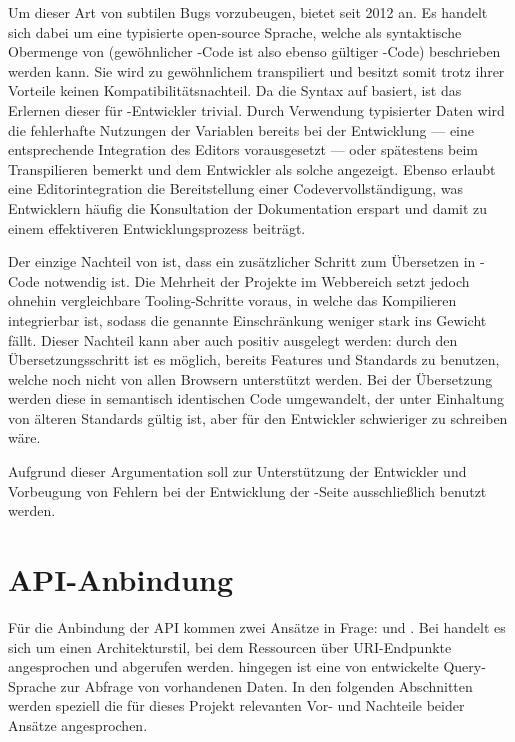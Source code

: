 Um dieser Art von subtilen Bugs vorzubeugen, bietet  seit 2012  an. Es handelt sich dabei um eine typisierte open-source Sprache, welche als syntaktische Obermenge von  (gewöhnlicher -Code ist also ebenso gültiger -Code) beschrieben werden kann. Sie wird zu gewöhnlichem  transpiliert und besitzt somit trotz ihrer Vorteile keinen Kompatibilitätsnachteil. Da die Syntax auf  basiert, ist das Erlernen dieser für -Entwickler trivial. Durch Verwendung typisierter Daten wird die fehlerhafte Nutzungen der Variablen bereits bei der Entwicklung --- eine entsprechende Integration des Editors vorausgesetzt --- oder spätestens beim Transpilieren bemerkt und dem Entwickler als solche angezeigt. Ebenso erlaubt eine Editorintegration die Bereitstellung einer Codevervollständigung, was Entwicklern häufig die Konsultation der Dokumentation erspart und damit zu einem effektiveren Entwicklungsprozess beiträgt.

Der einzige Nachteil von  ist, dass ein zusätzlicher Schritt zum Übersetzen in -Code notwendig ist. 
Die Mehrheit der Projekte im Webbereich setzt jedoch ohnehin vergleichbare Tooling-Schritte voraus, in welche das Kompilieren integrierbar ist, sodass die genannte Einschränkung weniger stark ins Gewicht fällt. Dieser Nachteil kann aber auch positiv ausgelegt werden: durch den Übersetzungsschritt ist es möglich, bereits Features und Standards zu benutzen, welche noch nicht von allen Browsern unterstützt werden. Bei der Übersetzung werden diese in semantisch identischen Code umgewandelt, der unter Einhaltung von älteren Standards gültig ist, aber für den Entwickler schwieriger zu schreiben wäre. 

Aufgrund dieser Argumentation soll zur Unterstützung der Entwickler und Vorbeugung von Fehlern bei der Entwicklung der -Seite ausschließlich  benutzt werden. 

\section{API-Anbindung}
Für die Anbindung der API kommen zwei Ansätze in Frage:  und \@. Bei  handelt es sich um einen Architekturstil, bei dem Ressourcen über URI-Endpunkte angesprochen und abgerufen werden.  hingegen ist eine von  entwickelte Query-Sprache zur Abfrage von vorhandenen Daten. In den folgenden Abschnitten werden speziell die für dieses Projekt relevanten Vor- und Nachteile beider Ansätze angesprochen.

